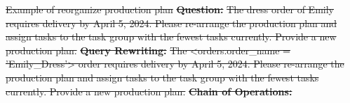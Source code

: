 \documentclass[preprint,12pt]{elsarticle}
\providecommand{\DIFdeltex}[1]{{\protect\color{red}\sout{#1}}}                      %
\providecommand{\DIFdel}[1]{\texorpdfstring{\DIFdeltex{#1}}{}} %
\begin{document}
{%
\DIFdel{Example of reorganize production plan}}
\textbf{\DIFdel{Question:}} %
\DIFdel{The dress order of Emily requires delivery by April 5, 2024. Please re-arrange the production plan and assign tasks to the task group with the fewest tasks currently. Provide a new production plan.}%
\textbf{\DIFdel{Query Rewriting: }}
\DIFdel{The <orders.order\_name = 'Emily\_Dress'> order requires delivery by April 5, 2024. Please re-arrange the production plan and assign tasks to the task group with the fewest tasks currently. Provide a new production plan.}%
\textbf{\DIFdel{Chain of Operations:}}%
\end{document}

